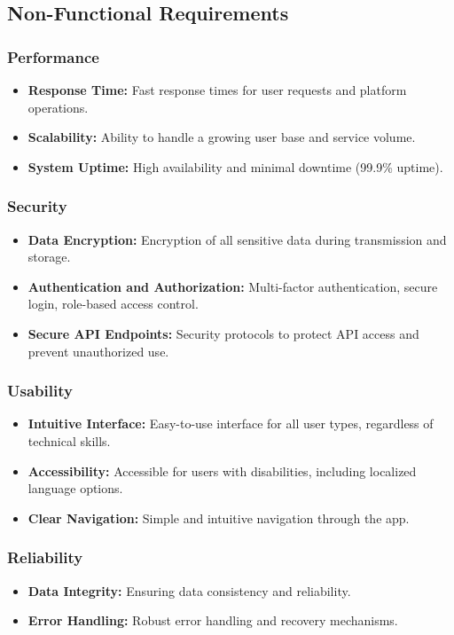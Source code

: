 \documentclass[12pt]{article}
\begin{document}
\subsection{Non-Functional Requirements}

\subsubsection{Performance}
\begin{itemize}
    \item \textbf{Response Time:} Fast response times for user requests and platform operations.
    \item \textbf{Scalability:} Ability to handle a growing user base and service volume.
    \item \textbf{System Uptime:} High availability and minimal downtime (99.9\% uptime).
\end{itemize}

\subsubsection{Security}
\begin{itemize}
     \item \textbf{Data Encryption:} Encryption of all sensitive data during transmission and storage.
    \item \textbf{Authentication and Authorization:} Multi-factor authentication, secure login, role-based access control.
    \item \textbf{Secure API Endpoints:} Security protocols to protect API access and prevent unauthorized use.
\end{itemize}

\subsubsection{Usability}
\begin{itemize}
    \item \textbf{Intuitive Interface:} Easy-to-use interface for all user types, regardless of technical skills.
    \item \textbf{Accessibility:} Accessible for users with disabilities, including localized language options.
    \item \textbf{Clear Navigation:} Simple and intuitive navigation through the app.
\end{itemize}

\subsubsection{Reliability}
\begin{itemize}
    \item \textbf{Data Integrity:} Ensuring data consistency and reliability.
    \item \textbf{Error Handling:} Robust error handling and recovery mechanisms.
\end{itemize}
\end{document}
